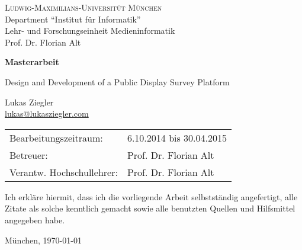 \documentclass[11pt,a4paper,twoside]{article}
\begin{document}
\pagestyle{empty} %

\begin{center}
\textsc{Ludwig-Maximilians-Universit\"ut M\"unchen}\\
Department ``Institut f\"ur Informatik''\\
Lehr- und Forschungseinheit Medieninformatik\\
Prof. Dr. Florian Alt

\vspace{5cm}
{\large\textbf{Masterarbeit}}\vspace{.5cm}

{\LARGE Design and Development of a Public Display Survey Platform}\vspace{1cm}

{\large Lukas Ziegler}\\\href{mailto:lukas@lukasziegler.com}{lukas@lukasziegler.com}

\end{center}
\vfill

\begin{tabular}{ll}
Bearbeitungszeitraum: & 6.10.2014 bis 30.04.2015\\
Betreuer: & Prof. Dr. Florian Alt\\
Verantw. Hochschullehrer: & Prof. Dr. Florian Alt
\end{tabular}

\clearpage

    

\clearpage

    


\vfill %

\noindent Ich erkl\"are hiermit, dass ich die vorliegende Arbeit
selbstst\"andig angefertigt, alle Zitate als solche kenntlich gemacht
sowie alle benutzten Quellen und Hilfsmittel angegeben habe.

\bigskip\noindent M\"unchen, \today

\vspace{4ex}\noindent\makebox[7cm]{\dotfill}


\cleardoublepage
\pagestyle{fancy}
\setcounter{page}{1}

\tableofcontents
\end{document}
